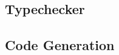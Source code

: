\documentclass{article}
\begin{document}

\subsection{Typechecker}




\subsection{Code Generation}

\end{document}

